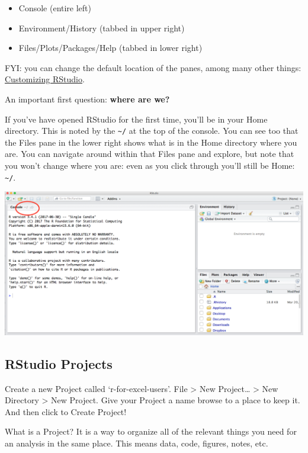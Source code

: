 \documentclass[]{book}
\providecommand{\tightlist}{%
  \setlength{\itemsep}{0pt}\setlength{\parskip}{0pt}}
\begin{document}
\begin{itemize}
\tightlist
\item
  Console (entire left)
\item
  Environment/History (tabbed in upper right)
\item
  Files/Plots/Packages/Help (tabbed in lower right)
\end{itemize}

FYI: you can change the default location of the panes, among many other things: \href{https://support.rstudio.com/hc/en-us/articles/200549016-Customizing-RStudio}{Customizing RStudio}.

An important first question: \textbf{where are we?}

If you've have opened RStudio for the first time, you'll be in your Home directory. This is noted by the \texttt{\textasciitilde{}/} at the top of the console. You can see too that the Files pane in the lower right shows what is in the Home directory where you are. You can navigate around within that Files pane and explore, but note that you won't change where you are: even as you click through you'll still be Home: \texttt{\textasciitilde{}/}.

\includegraphics[width=0.8\linewidth]{img/RStudio_IDE_homedir}

\hypertarget{rstudio-projects}{%
\subsection{RStudio Projects}\label{rstudio-projects}}

Create a new Project called `r-for-excel-users'. File \textgreater{} New Project\ldots{} \textgreater{} New Directory \textgreater{} New Project. Give your Project a name browse to a place to keep it. And then click to Create Project!

What is a Project? It is a way to organize all of the relevant things you need for an analysis in the same place. This means data, code, figures, notes, etc.
\end{document}
